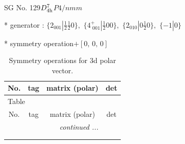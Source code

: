 \documentclass[fleqn,8pt]{jsarticle}
\begin{document}
\setcounter{MaxMatrixCols}{32}

\renewcommand{\tablename}{Table~}
\renewcommand{\figurename}{Figure~}
\begin{center}
\LARGE
SG No. 129\quad$D_{\rm 4h}^{7}$\quad$P4/nmm$\quad[ tetragonal ]
\end{center}

* generator : $\{2{}_{001}|\frac{1}{2} \frac{1}{2} 0\},\,\,\{4^{+}_{\,\,001}|\frac{1}{2} 0 0\},\,\,\{2{}_{010}|0 \frac{1}{2} 0\},\,\,\{-1|0\}$

* symmetry operation\quad$+\left[ 0,\, 0,\, 0 \right]$
\renewcommand{\arraystretch}{1.3}
\begin{longtable}{cccc}
\caption{Symmetry operations for 3d polar vector.}
 \\
 \hline \hline
No. & tag & matrix (polar) & det \\ \hline \endfirsthead

\multicolumn{3}{l}{\tablename\ \thetable{}} \\
 \hline \hline
No. & tag & matrix (polar) & det \\ \hline \endhead

 \hline \hline
\multicolumn{3}{r}{\footnotesize\it continued ...} \\ \endfoot

 \hline \hline
\multicolumn{3}{r}{} \\ \endlastfoot


\end{longtable}
\end{document}
